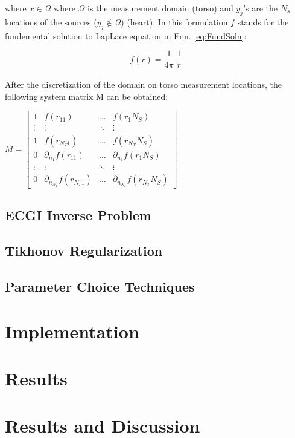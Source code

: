 \documentclass[draftcls, onecolumn, journal]{IEEEtran}
\begin{document}
where $x \in \Omega$ where $\Omega$ is the measurement domain (torso) and $y_j$'s are the $N_s$ locations of the sources ($y_j \notin \Omega$) (heart). In this formulation $f$ stands for the fundemental solution to LapLace equation in Eqn. \ref{eq:FundSoln}:

\begin{equation}
    f(r) = \frac{1}{4\pi} \frac{1}{|r|}
    \label{eq:FundSoln}
\end{equation}

After the discretization of the domain on torso measurement locations, the following system matrix M can be obtained:

\begin{center}
    $M = \begin{bmatrix} 
        1 & f(r_{11}) & \dots & f(r_1 N_S) \\
        \vdots & \vdots  & \ddots & \vdots\\
        1 &  f(r_{N_T1}) & \dots & f(r_{N_T} N_S) \\ 
        0 & \partial_{n_1}f(r_{11}) & \dots & \partial_{n_1}f(r_1 N_S) \\
        \vdots & \vdots  & \ddots & \vdots\\
        0 &  \partial_{n_{N_T}}f(r_{N_T1}) & \dots & \partial_{n_{N_T}}f(r_{N_T} N_S)     
        \end{bmatrix}$    
\end{center}

\subsection{ECGI Inverse Problem}\label{subsec:ecginv}

\subsection{Tikhonov Regularization}\label{subsec:tikreg}

\subsection{Parameter Choice Techniques}\label{subsec:paramselect}

\section{Implementation}\label{sec:implementation}


\section{Results}\label{sec:results}
\section{Results and Discussion}\label{sec:discussion}

\printbibliography
\end{document}
